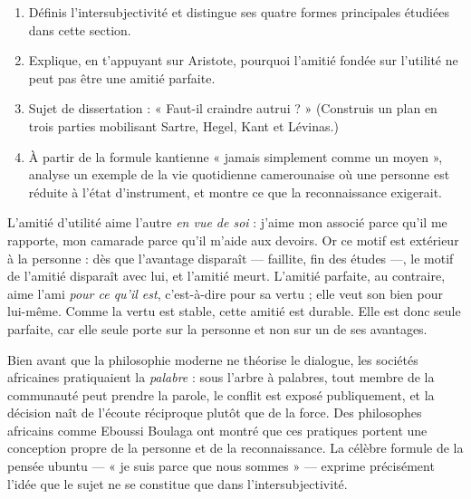 \documentclass[11pt]{article}
\begin{document}
\begin{exercice}
\begin{enumerate}
\item Définis l'intersubjectivité et distingue ses quatre formes principales étudiées dans cette section.
\item Explique, en t'appuyant sur Aristote, pourquoi l'amitié fondée sur l'utilité ne peut pas être une amitié parfaite.
\item Sujet de dissertation : « Faut-il craindre autrui ? » (Construis un plan en trois parties mobilisant Sartre, Hegel, Kant et Lévinas.)
\item À partir de la formule kantienne « jamais simplement comme un moyen », analyse un exemple de la vie quotidienne camerounaise où une personne est réduite à l'état d'instrument, et montre ce que la reconnaissance exigerait.
\end{enumerate}
\end{exercice}

\begin{corrige}[Exercice 2]
L'amitié d'utilité aime l'autre \emph{en vue de soi} : j'aime mon associé parce qu'il me rapporte, mon camarade parce qu'il m'aide aux devoirs. Or ce motif est extérieur à la personne : dès que l'avantage disparaît — faillite, fin des études —, le motif de l'amitié disparaît avec lui, et l'amitié meurt. L'amitié parfaite, au contraire, aime l'ami \emph{pour ce qu'il est}, c'est-à-dire pour sa vertu ; elle veut son bien pour lui-même. Comme la vertu est stable, cette amitié est durable. Elle est donc seule parfaite, car elle seule porte sur la personne et non sur un de ses avantages.
\end{corrige}

\begin{savaistu}
Bien avant que la philosophie moderne ne théorise le dialogue, les sociétés africaines pratiquaient la \emph{palabre} : sous l'arbre à palabres, tout membre de la communauté peut prendre la parole, le conflit est exposé publiquement, et la décision naît de l'écoute réciproque plutôt que de la force. Des philosophes africains comme Eboussi Boulaga ont montré que ces pratiques portent une conception propre de la personne et de la reconnaissance. La célèbre formule de la pensée ubuntu — « je suis parce que nous sommes » — exprime précisément l'idée que le sujet ne se constitue que dans l'intersubjectivité.
\end{savaistu}
\end{document}
